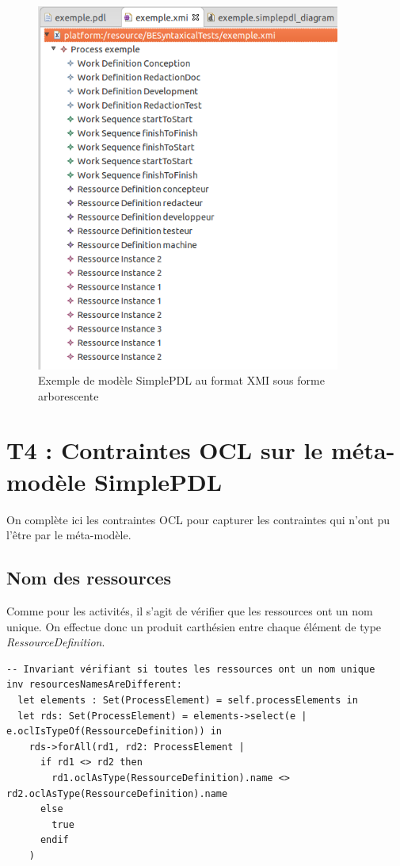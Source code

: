 \documentclass{report}
\begin{document}
\begin{figure}[!h] 
\begin{center}
\includegraphics[width=10cm]{Capture-12.png}
\caption{Exemple de modèle SimplePDL au format XMI sous forme arborescente} 
\label{img1} 
\end{center}
\end{figure} 

\newpage

\section{T4 : Contraintes OCL sur le méta-modèle SimplePDL}

On complète ici les contraintes OCL pour capturer les contraintes qui n’ont pu l’être par le méta-modèle.

\subsection{Nom des ressources}

Comme pour les activités, il s'agit de vérifier que les ressources ont un nom unique.
On effectue donc un produit carthésien entre chaque élément de type \textit{RessourceDefinition}.\\

\begin{verbatim}
-- Invariant vérifiant si toutes les ressources ont un nom unique
inv resourcesNamesAreDifferent:
  let elements : Set(ProcessElement) = self.processElements in
  let rds: Set(ProcessElement) = elements->select(e | e.oclIsTypeOf(RessourceDefinition)) in
    rds->forAll(rd1, rd2: ProcessElement |
      if rd1 <> rd2 then
        rd1.oclAsType(RessourceDefinition).name <> rd2.oclAsType(RessourceDefinition).name
      else
        true
      endif
    )
\end{verbatim}
\end{document}
